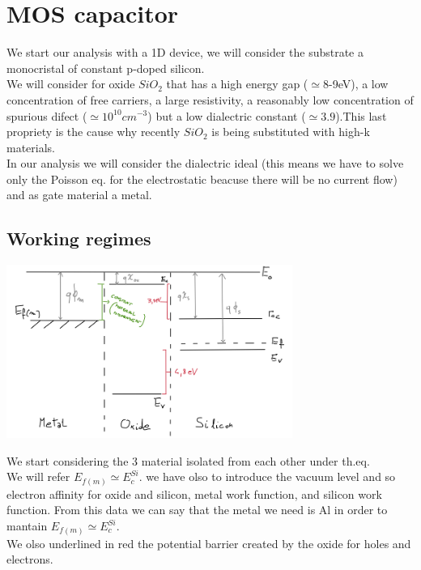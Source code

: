\chapter{MOS capacitor}
We start our analysis with a 1D device, we will consider the substrate a monocristal of constant p-doped silicon.\\
We will consider for oxide $SiO_{2}$ that has a high energy gap ($\simeq$8-9eV), a low concentration of free carriers, a large resistivity, a reasonably low concentration of spurious difect ($\simeq 10^{10}cm^{-3}$) but a low dialectric constant ($\simeq 3.9$).This last propriety is the cause why recently $SiO_2$ is being substituted with high-k materials.\\
In our analysis we will consider the dialectric ideal (this means we have to solve only the Poisson eq. for the electrostatic beacuse there will be no current flow) and as gate material a metal.\\

\section{Working regimes}
\centering
\includegraphics[width=0.7\textwidth]{mos_separate_material.png}\\
\raggedright

We start considering the 3 material isolated from each other under th.eq.\\
We will refer $E_{f(m)}\simeq E_{c}^{Si}$. we have olso to introduce the vacuum level and so electron affinity for oxide and silicon, metal work function, and silicon work function. From this data we can say that the metal we need is Al in order to mantain $E_{f(m)}\simeq E_{c}^{Si}$.\\
We olso underlined in red the potential barrier created by the oxide for holes and electrons.\\

